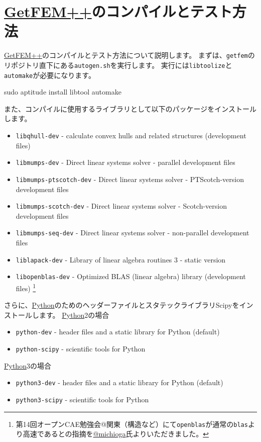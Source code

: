 \documentclass{../../style/ltjoc}
\begin{document}
\section{\href{http://getfem.org}{GetFEM++}のコンパイルとテスト方法}
\href{http://getfem.org}{GetFEM++}のコンパイルとテスト方法について説明します。
まずは、\texttt{getfem}のリポジトリ直下にある\texttt{autogen.sh}を実行します。
実行には\texttt{libtoolize}と\texttt{automake}が必要になります。
\begin{shbox}
  \shline{} {sudo aptitude install libtool automake}
\end{shbox}
また、コンパイルに使用するライブラリとして以下のパッケージをインストールします。
\begin{itemize}
  \item \texttt{libqhull-dev} - calculate convex hulls and related structures (development files)
  \item \texttt{libmumps-dev} - Direct linear systems solver - parallel development files                  
  \item \texttt{libmumps-ptscotch-dev} - Direct linear systems solver - PTScotch-version development files          
  \item \texttt{libmumps-scotch-dev} - Direct linear systems solver - Scotch-version development files            
  \item \texttt{libmumps-seq-dev} - Direct linear systems solver - non-parallel development files              
  \item \texttt{liblapack-dev} - Library of linear algebra routines 3 - static version
  \item \texttt{libopenblas-dev} - Optimized BLAS (linear algebra) library (development files)
  \footnote{
    第14回オープンCAE勉強会@関東（構造など）にて\texttt{openblas}が通常の\texttt{blas}より高速であるとの指摘を\href{https://twitter.com/michioga}{@michioga}氏よりいただきました。
  }
\end{itemize}
さらに、\href{https://www.python.org/}{Python}のためのヘッダーファイルとスタテックライブラリScipyをインストールします。
\href{https://www.python.org/}{Python}2の場合
\begin{itemize}
  \item \texttt{python-dev} - header files and a static library for Python (default)
  \item \texttt{python-scipy} - scientific tools for Python
\end{itemize}
\href{https://www.python.org/}{Python}3の場合
\begin{itemize}
  \item \texttt{python3-dev} - header files and a static library for Python (default)
  \item \texttt{python3-scipy} - scientific tools for Python
\end{itemize}
\end{document}
